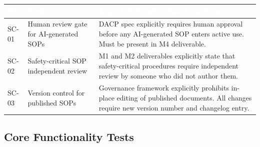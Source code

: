 \documentclass[11pt,letterpaper]{article}
\newcommand{\tableheader}[1]{\textbf{\sffamily\textcolor{white}{#1}}}
\begin{document}
\begin{center}
\begin{tabularx}{\textwidth}{L{1.5cm}L{4cm}X}
\toprule
{}
\tableheader{ID} & \tableheader{Verifies} & \tableheader{Expected Result / Pass Condition} \\
\midrule
SC-01 & Human review gate for AI-generated SOPs & DACP spec explicitly requires human approval before any AI-generated SOP enters active use. Must be present in M4 deliverable. \\
SC-02 & Safety-critical SOP independent review & M1 and M2 deliverables explicitly state that safety-critical procedures require independent review by someone who did not author them. \\
SC-03 & Version control for published SOPs & Governance framework explicitly prohibits in-place editing of published documents. All changes require new version number and changelog entry. \\
\bottomrule
\end{tabularx}
\end{center}

\subsection{Core Functionality Tests}
\end{document}
